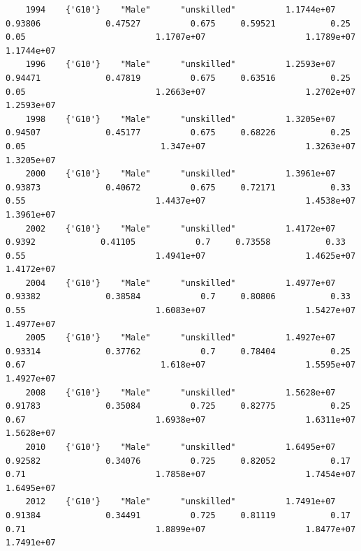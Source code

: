 \documentclass[
]{book}
\begin{document}
\begin{verbatim}
    1994    {'G10'}    "Male"      "unskilled"          1.1744e+07            0.93806             0.47527          0.675     0.59521           0.25               0.05                          1.1707e+07                    1.1789e+07             1.1744e+07        
    1996    {'G10'}    "Male"      "unskilled"          1.2593e+07            0.94471             0.47819          0.675     0.63516           0.25               0.05                          1.2663e+07                    1.2702e+07             1.2593e+07        
    1998    {'G10'}    "Male"      "unskilled"          1.3205e+07            0.94507             0.45177          0.675     0.68226           0.25               0.05                           1.347e+07                    1.3263e+07             1.3205e+07        
    2000    {'G10'}    "Male"      "unskilled"          1.3961e+07            0.93873             0.40672          0.675     0.72171           0.33               0.55                          1.4437e+07                    1.4538e+07             1.3961e+07        
    2002    {'G10'}    "Male"      "unskilled"          1.4172e+07             0.9392             0.41105            0.7     0.73558           0.33               0.55                          1.4941e+07                    1.4625e+07             1.4172e+07        
    2004    {'G10'}    "Male"      "unskilled"          1.4977e+07            0.93382             0.38584            0.7     0.80806           0.33               0.55                          1.6083e+07                    1.5427e+07             1.4977e+07        
    2005    {'G10'}    "Male"      "unskilled"          1.4927e+07            0.93314             0.37762            0.7     0.78404           0.25               0.67                           1.618e+07                    1.5595e+07             1.4927e+07        
    2008    {'G10'}    "Male"      "unskilled"          1.5628e+07            0.91783             0.35084          0.725     0.82775           0.25               0.67                          1.6938e+07                    1.6311e+07             1.5628e+07        
    2010    {'G10'}    "Male"      "unskilled"          1.6495e+07            0.92582             0.34076          0.725     0.82052           0.17               0.71                          1.7858e+07                    1.7454e+07             1.6495e+07        
    2012    {'G10'}    "Male"      "unskilled"          1.7491e+07            0.91384             0.34491          0.725     0.81119           0.17               0.71                          1.8899e+07                    1.8477e+07             1.7491e+07        

\end{verbatim}
\end{document}
